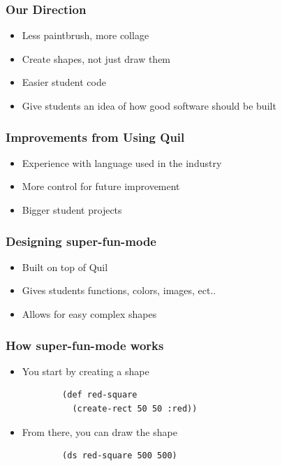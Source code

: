 \documentclass{beamer}
\begin{document}
\begin{frame}
	\frametitle{Our Direction}
	\begin{itemize}
		\item Less paintbrush, more collage
		\item Create shapes, not just draw them
		\item Easier student code
		\item Give students an idea of how good software should be built              
	\end{itemize}
\end{frame}

\begin{frame}
	\frametitle{Improvements from Using Quil}
	\begin{itemize}
		\item Experience with language used in the industry
		\item More control for future improvement
		\item Bigger student projects
	\end{itemize}
\end{frame}

\begin{frame}
	\frametitle{Designing super-fun-mode}
	\begin{itemize}
		\item Built on top of Quil
		\item Gives students functions, colors, images, ect..
		\item Allows for easy complex shapes
	\end{itemize}
\end{frame}

\begin{frame}[fragile]
	\frametitle{How super-fun-mode works}
	\begin{itemize}
		\item You start by creating a shape
		\begin{verbatim}
		(def red-square 
		  (create-rect 50 50 :red))
		\end{verbatim}
		\item From there, you can draw the shape
		\begin{verbatim}
		(ds red-square 500 500)
		\end{verbatim}
	\end{itemize}
\end{frame}
\end{document}
